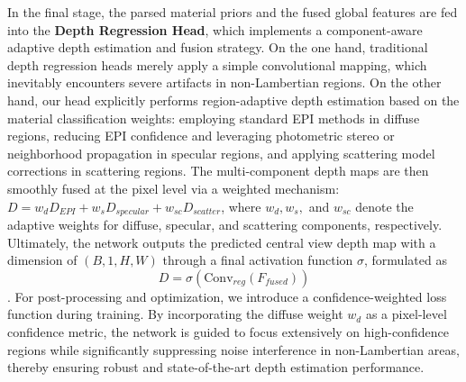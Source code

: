 \documentclass[journal]{IEEEtran}
\begin{document}
In the final stage, the parsed material priors and the fused global features are fed into the \textbf{Depth Regression Head}, which implements a component-aware adaptive depth estimation and fusion strategy. On the one hand, traditional depth regression heads merely apply a simple convolutional mapping, which inevitably encounters severe artifacts in non-Lambertian regions. On the other hand, our head explicitly performs region-adaptive depth estimation based on the material classification weights: employing standard EPI methods in diffuse regions, reducing EPI confidence and leveraging photometric stereo or neighborhood propagation in specular regions, and applying scattering model corrections in scattering regions. The multi-component depth maps are then smoothly fused at the pixel level via a weighted mechanism: \(D = w_d D_{EPI} + w_s D_{specular} + w_{sc} D_{scatter}\), where $w_d, w_s,$ and $w_{sc}$ denote the adaptive weights for diffuse, specular, and scattering components, respectively. Ultimately, the network outputs the predicted central view depth map with a dimension of $(B, 1, H, W)$ through a final activation function $\sigma$, formulated as \[
D = \sigma(\text{Conv}_{reg}(F_{fused}))
\]. For post-processing and optimization, we introduce a confidence-weighted loss function during training. By incorporating the diffuse weight $w_d$ as a pixel-level confidence metric, the network is guided to focus extensively on high-confidence regions while significantly suppressing noise interference in non-Lambertian areas, thereby ensuring robust and state-of-the-art depth estimation performance.
\end{document}
